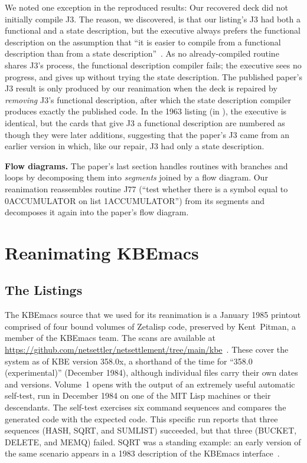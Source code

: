 \documentclass[11pt]{article}
\begin{document}
We noted one exception in the reproduced results: Our recovered deck
did not initially compile J3. The reason, we discovered, is that our
listing's J3 had both a functional and a state description, but the
executive always prefers the functional description on the assumption
that ``it is easier to compile from a functional description than from
a state description''~\cite[p.~502]{simon1963jacm}. As no
already-compiled routine shares J3's process, the functional
description compiler fails; the executive sees no progress, and gives
up without trying the state description. The published paper's J3
result is only produced by our reanimation when the deck is repaired
by \emph{removing} J3's functional description, after which the state
description compiler produces exactly the published code. In the 1963
listing (in \cite{simonRM3588}), the executive is identical, but the
cards that give J3 a functional description are numbered as though
they were later additions, suggesting that the paper's J3 came from an
earlier version in which, like our repair, J3 had only a state
description.

\textbf{Flow diagrams.} The paper's last section handles routines with
branches and loops by decomposing them into \emph{segments} joined by
a flow diagram. Our reanimation reassembles routine J77 (``test
whether there is a symbol equal to 0ACCUMULATOR on list
1ACCUMULATOR'') from its segments and decomposes it again into the
paper's flow diagram.

\section{Reanimating KBEmacs}
\label{sec:kbe}

\subsection{The Listings}

The KBEmacs source that we used for its reanimation is a January 1985
printout comprised of four bound volumes of Zetalisp code, preserved
by Kent~Pitman, a member of the KBEmacs team. The scans are available
at
\url{https://github.com/netsettler/netsettlement/tree/main/kbe}~\cite{pitmanscans}. These
cover the system as of KBE version 358.0x, a shorthand of the time for ``358.0
(experimental)'' (December 1984), although
individual files carry their own dates and versions. Volume~1 opens
with the output of an extremely useful automatic self-test, run in
December 1984 on one of the MIT Lisp machines or their descendants. The self-test exercises six
command sequences and compares the generated code with the expected
code.  This specific run reports that three sequences (HASH, SQRT, and
SUMLIST) succeeded, but that three (BUCKET, DELETE, and MEMQ) failed.
SQRT was a standing example: an early version of the same scenario
appears in a 1983 description of the KBEmacs interface~\cite{pitman1983wp244}.
\end{document}
